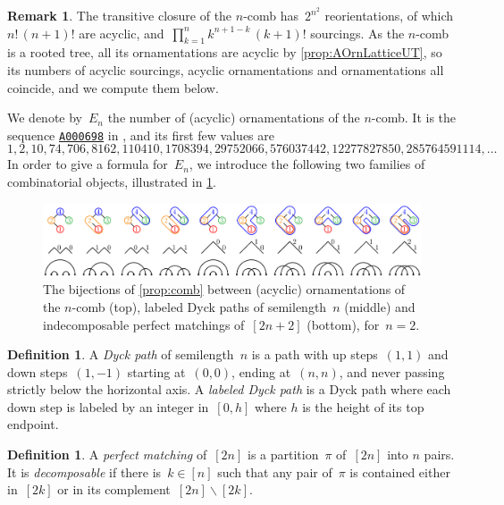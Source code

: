 \documentclass{amsart}
\theoremstyle{definition}
\newtheorem{definition}[theorem]{Definition}
\newtheorem{remark}[theorem]{Remark}
\newcommand{\ssm}{\smallsetminus} %
\newcommand{\darkblue}{\color{darkblue}} %
\newcommand{\defn}[1]{\textsl{\darkblue #1}} %
\newcommand{\OEIS}[1]{{\rm \href{http://oeis.org/#1}{\texttt{#1}}}}
\begin{document}
\begin{remark}
The transitive closure of the $n$-comb has~$2^{n^2}$ reorientations, of which $n! \, (n+1)!$ are acyclic, and~$\prod_{k = 1}^n k^{n+1-k} \, (k+1)!$ sourcings.
As the $n$-comb is a rooted tree, all its ornamentations are acyclic by \cref{prop:AOrnLatticeUT}, so its numbers of acyclic sourcings, acyclic ornamentations and ornamentations all coincide, and we compute them below.
\end{remark}

We denote by~$E_n$ the number of (acyclic) ornamentations of the $n$-comb.
It is the sequence \OEIS{A000698} in \cite{OEIS}, and its first few values are
\[
1, 2, 10, 74, 706, 8162, 110410, 1708394, 29752066, 576037442, 12277827850, 285764591114, \dots
\]
In order to give a formula for~$E_n$, we introduce the following two families of combinatorial objects, illustrated in \cref{fig:comb}.

\begin{figure}
	\centerline{\includegraphics[scale=.68]{comb}}
	\caption{The bijections of \cref{prop:comb} between (acyclic) ornamentations of the $n$-comb (top), labeled Dyck paths of semilength~$n$ (middle) and indecomposable perfect matchings of~$[2n+2]$ (bottom), for~$n = 2$.}
	\label{fig:comb}
\end{figure}

\begin{definition}
A \defn{Dyck path} of semilength~$n$ is a path with up steps~$(1,1)$ and down steps~$(1,-1)$ starting at~$(0,0)$, ending at~$(n,n)$, and never passing strictly below the horizontal axis.
A \defn{labeled Dyck path} is a Dyck path where each down step is labeled by an integer in~$[0,h]$ where $h$ is the height of its top endpoint.
\end{definition}

\begin{definition}
A \defn{perfect matching} of~$[2n]$ is a partition~$\pi$ of~$[2n]$ into $n$ pairs.
It is \defn{decomposable} if there is~$k \in [n]$ such that any pair of~$\pi$ is contained either in~$[2k]$ or in its complement~$[2n] \ssm [2k]$.
\end{definition}
\end{document}
